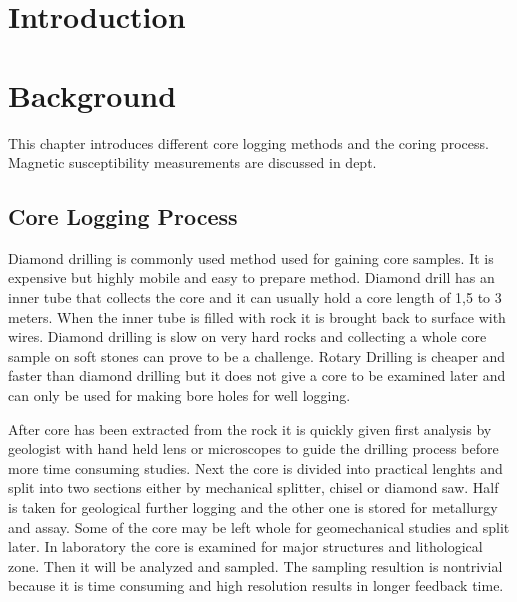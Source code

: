\documentclass[12pt,a4paper,oneside,pdftex]{report}
\begin{document}

% 

\chapter{Introduction}
\label{chapter:intro}






% 

\chapter{Background}
\label{chapter:background}

This chapter introduces different core logging methods and the coring process. 
Magnetic susceptibility measurements are discussed in dept.

\section{Core Logging Process}

Diamond drilling is commonly used method used for gaining core samples. It is expensive but highly
mobile and easy to prepare method. Diamond drill has an inner tube that collects the core and it can 
usually  hold a core length of 1,5 to 3 meters. When the inner tube is filled with rock it is brought
back to surface with wires. Diamond drilling is slow on very hard rocks and collecting a whole core
sample on soft stones can prove to be a challenge. Rotary Drilling is cheaper and faster than diamond
drilling but it does not give a core to be examined later and can only be used for making bore holes
for well logging.\cite{Peters1987}


After core has been extracted from the rock it is quickly given first analysis by geologist with 
hand held lens or microscopes to guide the drilling process before more time consuming studies. 
Next the core is divided into practical lenghts and split into two
sections either by mechanical splitter, chisel or diamond saw. Half is taken for geological further
logging and the other one is stored for metallurgy and assay. Some of the core may be left whole
for geomechanical studies and split later. In laboratory the core is examined for major 
structures and lithological zone. Then it will be analyzed and sampled. The sampling resultion 
is nontrivial because it is time consuming and high resolution results in longer feedback time.\cite{Peters1987}
\end{document}
